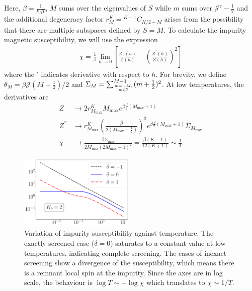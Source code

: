\documentclass[reprint,prb,superscriptaddress]{revtex4-1}
\begin{document}
Here, \(\beta = \frac{1}{k_B T}\), \(M\) sums over the eigenvalues of \(S\) while \(m\) sums over \({\mathcal{J}}^z - \frac{1}{2}\) and the additional degeneracy factor \(r^K_M= {}^{K-1}C_{K/2 - M}\) arises from the possibility that there are multiple subspaces defined by \(S=M\). 
To calculate the impurity magnetic susceptibility, we will use the expression
\begin{align}
	\chi = \frac{1}{\beta}\lim_{h \to 0}\left[\frac{Z^{\prime\prime}(h)}{Z(h)} - \left(\frac{Z^{\prime}(h)}{Z(h)}\right)^2 \right] 
\end{align}
where the \(\prime\) indicates derivative with respect to \(h\). For brevity, we define \(\theta_M = \beta {\mathcal{J}} (M+\frac{1}{2})/2\) and \(\Sigma_M = \sum_{m=-M, \atop{m\in \mathbb{Z}}}^{M-1}(m+\frac{1}{2})^2\). At low temperatures, the derivatives are 
\begin{align}
	Z &\to 2 r^K_{M_\text{max}} M_\text{max} e^{\beta \frac{J}{2}(M_\text{max} + 1)}\\
	Z^{\prime \prime} &\to r^K_{M_\text{max}}\left(\frac{\beta }{2(M_\text{max} + \frac{1}{2})}\right)^2 e^{\beta \frac{J}{2}(M_\text{max} + 1)}\Sigma_{M_\text{max}}\\
	\chi &\to \frac{\beta\Sigma_\text{max}}{2M_\text{max}\left(2M_\text{max}+1\right)^2} = \frac{\beta(K-1)}{12(K+1)} \sim \frac{1}{T}
\end{align}



\begin{figure}[!htpb]
\centering
\includegraphics[width=0.49\textwidth]{plt/CentralFieldChiPowerlaw.pdf}
\caption{Variation of impurity susceptibility against temperature. The exactly screened case ($\delta=0$) saturates to a constant value at low temperatures, indicating complete screening. The cases of inexact screening show a divergence of the susceptibility, which means there is a remnant local spin at the impurity. Since the axes are in log scale, the behaviour is $\log T \sim -\log \chi$ which translates to $\chi \sim 1/T$.  }
\label{fig:suseptibility_impurity}
\end{figure}
\end{document}
